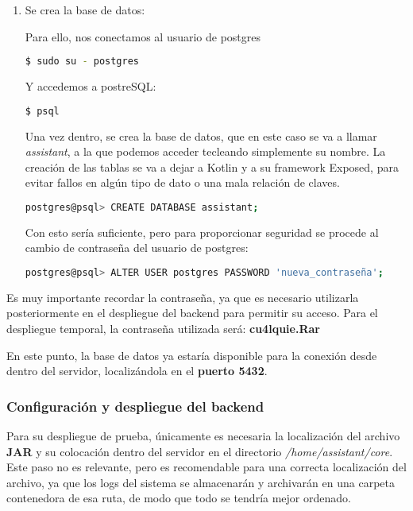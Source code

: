 \begin{enumerate}
        \item Se crea la base de datos:
        
            Para ello, nos conectamos al usuario de postgres
            \begin{lstlisting}[language=bash]
        $ sudo su - postgres
            \end{lstlisting}
            Y accedemos a postreSQL:
            \begin{lstlisting}[language=bash]
        $ psql
            \end{lstlisting}
            
            Una vez dentro, se crea la base de datos, que en este caso se va a llamar \textit{assistant}, a la que podemos acceder tecleando simplemente su nombre.
            La creación de las tablas se va a dejar a Kotlin y a su framework Exposed, para evitar fallos en algún tipo de dato o una mala relación de claves.
            \begin{lstlisting}[language=bash]
        postgres@psql> CREATE DATABASE assistant;
            \end{lstlisting}
            
            Con esto sería suficiente, pero para proporcionar seguridad se procede al cambio de contraseña del usuario de postgres:
            \begin{lstlisting}[language=bash]
        postgres@psql> ALTER USER postgres PASSWORD 'nueva_contraseña';
            \end{lstlisting}
            
    \end{enumerate}
    
    Es muy importante recordar la contraseña, ya que es necesario utilizarla posteriormente en el despliegue del backend para permitir su acceso. Para el despliegue temporal, la contraseña utilizada será: \textbf{cu4lquie.Rar}
    
    En este punto, la base de datos ya estaría disponible para la conexión desde dentro del servidor, localizándola en el \textbf{puerto 5432}.

\subsubsection{Configuración y despliegue del backend}

    Para su despliegue de prueba, únicamente es necesaria la localización del archivo \textbf{JAR} y su colocación dentro del servidor en el directorio \textit{/home/assistant/core}. Este paso no es relevante, pero es recomendable para una correcta localización del archivo, ya que los logs del sistema se almacenarán y archivarán en una carpeta contenedora de esa ruta, de modo que todo se tendría mejor ordenado.
    

